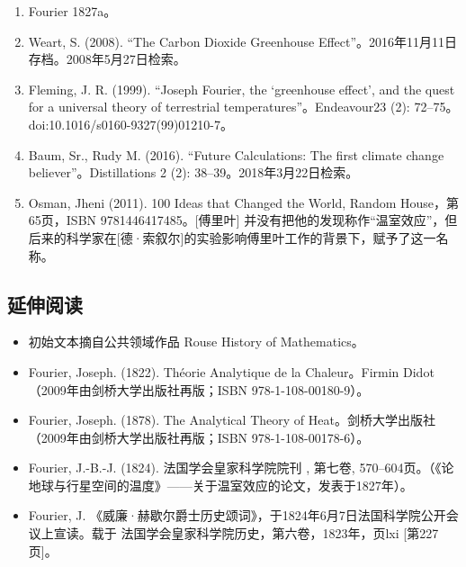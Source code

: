 \begin{enumerate}
\item Fourier 1827a。
\item Weart, S. (2008). “The Carbon Dioxide Greenhouse Effect”。2016年11月11日存档。2008年5月27日检索。
\item Fleming, J. R. (1999). “Joseph Fourier, the ‘greenhouse effect’, and the quest for a universal theory of terrestrial temperatures”。Endeavour23 (2): 72–75。doi:10.1016/s0160-9327(99)01210-7。
\item Baum, Sr., Rudy M. (2016). “Future Calculations: The first climate change believer”。Distillations 2 (2): 38–39。2018年3月22日检索。
\item Osman, Jheni (2011). 100 Ideas that Changed the World, Random House，第65页，ISBN 9781446417485。[傅里叶] 并没有把他的发现称作“温室效应”，但后来的科学家在[德·索叙尔]的实验影响傅里叶工作的背景下，赋予了这一名称。
\end{enumerate}
\subsection{延伸阅读}
\begin{itemize}
\item 初始文本摘自公共领域作品 Rouse History of Mathematics。
\item Fourier, Joseph. (1822). Théorie Analytique de la Chaleur。Firmin Didot（2009年由剑桥大学出版社再版；ISBN 978-1-108-00180-9）。
\item Fourier, Joseph. (1878). The Analytical Theory of Heat。剑桥大学出版社（2009年由剑桥大学出版社再版；ISBN 978-1-108-00178-6）。
\item Fourier, J.-B.-J. (1824). 法国学会皇家科学院院刊 , 第七卷, 570–604页。（《论地球与行星空间的温度》——关于温室效应的论文，发表于1827年）。
\item Fourier, J. 《威廉·赫歇尔爵士历史颂词》，于1824年6月7日法国科学院公开会议上宣读。载于 法国学会皇家科学院历史，第六卷，1823年，页lxi [第227页]。
\end{itemize}
